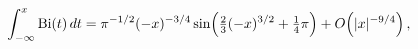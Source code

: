 \[\int_{-\infty}^{x}\mathop{\mathrm{Bi}\/}\nolimits\!\left(t\right)dt=\pi^{-1/2}%
(-x)^{-3/4}\*\mathop{\sin\/}\nolimits\!\left(\tfrac{2}{3}(-x)^{3/2}+\tfrac{1}{%
4}\pi\right)+\mathop{O\/}\nolimits\!\left(|x|^{-9/4}\right),\]